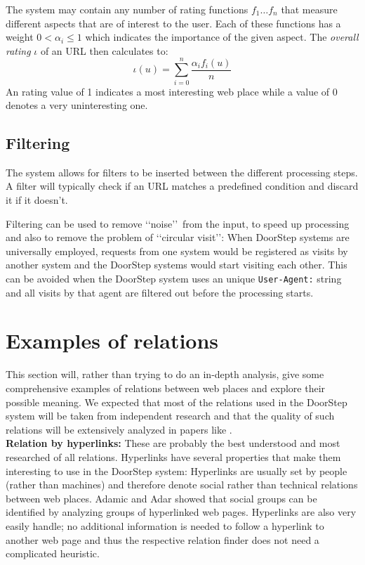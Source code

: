\documentclass[a4paper]{danarticle}
\theoremstyle{remark}
\begin{document}
       The system may contain any number of rating functions $ f_1
       \dots f_n $ that measure different aspects that are of interest to
       the user.
       Each of these functions has a weight
       $ 0 < \alpha_i \leq 1 $ which indicates the importance of the given 
       aspect.
       The \textit{overall rating} $ \iota $ of an URL then calculates
       to:
       \[
         \iota(u) = \sum_{i = 0}^{n} 
	 \frac{\alpha_i f_i(u)}{n}
       \]
       An rating value of 1 indicates a most interesting web place
       while a
       value of 0 denotes a very uninteresting one. 
     \subsection{Filtering}
       The system allows for filters to be inserted between the different
       processing steps. A filter will typically check if an URL matches a
       predefined condition and discard it if it doesn't.
       
       Filtering can be used to remove \lq\lq noise\rq\rq\ from the input, to 
       speed up processing and also to remove the problem of 
       \lq\lq circular visit\rq\rq : When DoorStep systems are universally 
       employed, requests from one system would be registered as visits by 
       another system and the DoorStep systems would start visiting each other. 
       This can be avoided when the DoorStep system uses an unique 
       \verb$User-Agent:$ string and all visits by that agent are filtered out 
       before the processing starts.
  \section{Examples of relations}
    This section will, rather than trying to do an in-depth analysis, give some 
    comprehensive examples of relations between web places and explore their 
    possible meaning. We expected that most of the relations used in the 
    DoorStep system will be taken from independent research and that the quality 
    of such relations will be extensively analyzed in papers like \cite{links}.
    \\
    
    \textbf{Relation by hyperlinks:} These are probably the best understood and 
    most researched of all relations. Hyperlinks have several properties that 
    make them interesting to use in the DoorStep system: Hyperlinks are usually 
    set by people (rather than machines) and therefore denote social rather than 
    technical relations between web places. Adamic and Adar showed that 
    social groups can be identified by analyzing groups of hyperlinked web 
    pages\cite{links}. Hyperlinks are also very easily handle; no additional 
    information is 
    needed to follow a hyperlink to another web page and thus the respective 
    relation finder does not need a complicated heuristic.
    \\
    
\end{document}
